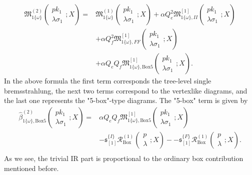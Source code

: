 \begin{align}
\mathfrak{M}^{(2)}_{1\{\omega\}}\left(\begin{array}{c}
pk_1\\\lambda\sigma_1
\end{array};X\right)=&\mathfrak{M}^{(1)}_{1\{\omega\}}\left(\begin{array}{c}
pk_1\\\lambda\sigma_1
\end{array};X\right)+\alpha Q^2_e\mathfrak{M}^{[1]}_{1\{\omega\},II}\left(\begin{array}{c}
pk_1\\\lambda\sigma_1
\end{array};X\right)\nonumber\\
&+\alpha Q^2_f\mathfrak{M}^{[1]}_{1\{\omega\},FF}\left(\begin{array}{c}
pk_1\\\lambda\sigma_1
\end{array};X\right)\nonumber\\
&+\alpha Q_e Q_f\mathfrak{M}^{[1]}_{1\{\omega\},\text{Box5}}\left(\begin{array}{c}
pk_1\\\lambda\sigma_1
\end{array};X\right).
\end{align}
In the above formula the first term corresponds the tree-level single bremsstrahlung, the next two terms correspond to the vertexlike diagrams, and the last one represents the "5-box"-type diagrams. The "5-box" term is given by
\begin{align}
\hat{\beta}^{(2)}_{1\{\omega\},\text{Box5}}\left(\begin{array}{c}
pk_1\\\lambda\sigma_1
\end{array};X\right)=&\alpha Q_eQ_f\mathfrak{M}^{[1]}_{1\{\omega\},\text{Box5}}\left(\begin{array}{c}
pk_1\\\lambda\sigma_1
\end{array};X\right)\nonumber\\
&-\mathfrak{s}_{[1]}^{\{I\}}\mathcal{R}^{(1)}_\text{Box}\left(\begin{array}{c}
p\\\lambda
\end{array};X\right)--\mathfrak{s}_{[1]}^{\{F\}}\mathcal{R}^{(1)}_\text{Box}\left(\begin{array}{c}
p\\\lambda
\end{array};X\right).\nonumber\\
\end{align}
As we see, the trivial IR part is proportional to the ordinary box contribution mentioned before. 

